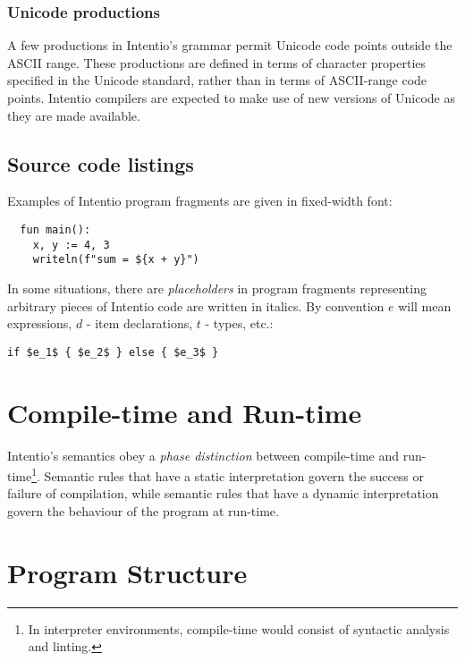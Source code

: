\subsubsection*{Unicode productions}

A few productions in Intentio's grammar permit Unicode\cite{Unicode} code points outside the ASCII range. These productions are defined in terms of character properties specified in the Unicode standard, rather than in terms of ASCII-range code points. Intentio compilers are expected to make use of new versions of Unicode as they are made available.

\subsection*{Source code listings}

Examples of Intentio program fragments are given in fixed-width font:

\begin{lstlisting}
  fun main():
    x, y := 4, 3
    writeln(f"sum = ${x + y}")
\end{lstlisting}

In some situations, there are \emph{placeholders} in program fragments representing arbitrary pieces of Intentio code are written in italics. By convention $e$ will mean expressions, $d$ - item declarations, $t$ - types, etc.:

\begin{lstlisting}[mathescape=true]
  if $e_1$ { $e_2$ } else { $e_3$ }
\end{lstlisting}


\section{Compile-time and Run-time}

Intentio's semantics obey a \emph{phase distinction} between compile-time and run-time\footnote{In interpreter environments, compile-time would consist of syntactic analysis and linting.}. Semantic rules that have a static interpretation govern the success or failure of compilation, while semantic rules that have a dynamic interpretation govern the behaviour of the program at run-time.


\section{Program Structure}

